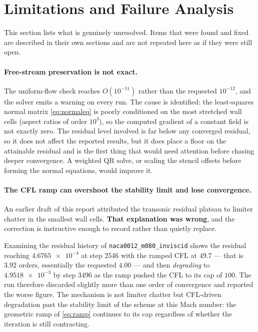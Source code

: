\section{Limitations and Failure Analysis}
\label{sec:limitations}

This section lists what is genuinely unresolved. Items that were found and fixed
are described in their own sections and are not repeated here as if they were
still open.

\paragraph{Free-stream preservation is not exact.} The uniform-flow check reaches
$O(10^{-11})$ rather than the requested $10^{-12}$, and the solver emits a warning
on every run. The cause is identified: the least-squares normal matrix
\cref{eq:normaleq} is poorly conditioned on the most stretched wall cells (aspect
ratios of order $10^3$), so the computed gradient of a constant field is not
exactly zero. The residual level involved is far below any converged residual, so
it does not affect the reported results, but it does place a floor on the
attainable residual and is the first thing that would need attention before
chasing deeper convergence. A weighted QR solve, or scaling the stencil offsets
before forming the normal equations, would improve it.

\paragraph{The CFL ramp can overshoot the stability limit and lose convergence.}
An earlier draft of this report attributed the transonic residual plateau to
limiter chatter in the smallest wall cells. \textbf{That explanation was wrong},
and the correction is instructive enough to record rather than quietly replace.

Examining the residual history of \texttt{naca0012\_m080\_inviscid} shows the
residual reaching $\num{4.6765e-4}$ at step 2546 with the ramped CFL at $49.7$ ---
that is $3.92$ orders, essentially the requested $4.00$ --- and then \emph{degrading}
to $\num{4.9518e-3}$ by step 3496 as the ramp pushed the CFL to its cap of $100$.
The run therefore discarded slightly more than one order of convergence and
reported the worse figure. The mechanism is not limiter chatter but CFL-driven
degradation past the stability limit of the scheme at this Mach number: the
geometric ramp of \cref{eq:ramp} continues to its cap regardless of whether the
iteration is still contracting.

